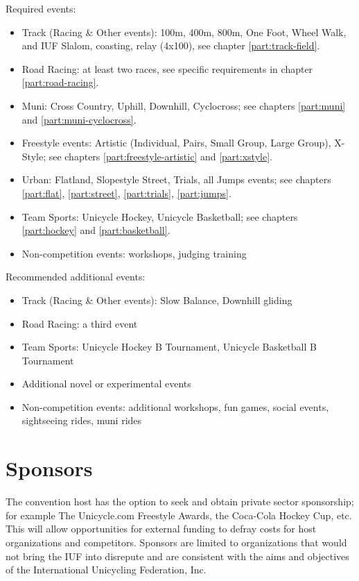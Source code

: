 Required events:
\begin{itemize}
\item Track (Racing \& Other events): 100m, 400m, 800m, One Foot, Wheel Walk, and IUF Slalom, coasting, relay (4x100), see chapter \ref{part:track-field}.
\item Road Racing: at least two races, see specific requirements in chapter \ref{part:road-racing}.
\item Muni: Cross Country, Uphill, Downhill, Cyclocross; see chapters \ref{part:muni} and \ref{part:muni-cyclocross}.
\item Freestyle events: Artistic (Individual, Pairs, Small Group, Large Group), X-Style; see chapters \ref{part:freestyle-artistic} and \ref{part:xstyle}.
\item Urban: Flatland, Slopestyle Street, Trials, all Jumps events; see chapters \ref{part:flat}, \ref{part:street}, \ref{part:trials}, \ref{part:jumps}.
\item Team Sports: Unicycle Hockey, Unicycle Basketball; see chapters \ref{part:hockey} and \ref{part:basketball}.
\item Non-competition events: workshops, judging training
\end{itemize}

Recommended additional events:
\begin{itemize}
\item Track (Racing \& Other events): Slow Balance, Downhill gliding
\item Road Racing: a third event
\item Team Sports: Unicycle Hockey B Tournament, Unicycle Basketball B Tournament
\item Additional novel or experimental events
\item Non-competition events: additional workshops, fun games, social events, sightseeing rides, muni rides
\end{itemize}

\section{Sponsors}

The convention host has the option to seek and obtain private sector sponsorship; for example The Unicycle.com Freestyle Awards, the Coca-Cola Hockey Cup, etc.
This will allow opportunities for external funding to defray costs for host organizations and competitors.
Sponsors are limited to organizations that would not bring the IUF into disrepute and are consistent with the aims and objectives of the International Unicycling Federation, Inc.

